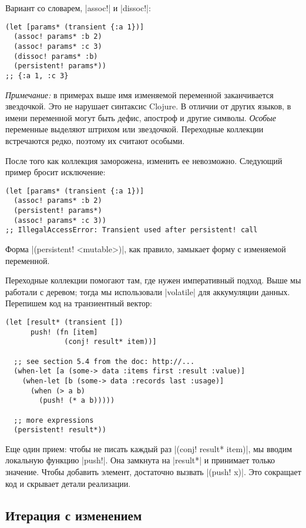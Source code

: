 \noindent
Вариант со словарем, \spverb|assoc!| и \spverb|dissoc!|:

\begin{verbatim}
(let [params* (transient {:a 1})]
  (assoc! params* :b 2)
  (assoc! params* :c 3)
  (dissoc! params* :b)
  (persistent! params*))
;; {:a 1, :c 3}
\end{verbatim}

\emph{Примечание:} в примерах выше имя изменяемой переменной заканчивается
звездочкой. Это не нарушает синтаксис Clojure. В отличии от других языков, в
имени переменной могут быть дефис, апостроф и другие символы. \emph{Особые}
переменные выделяют штрихом или звездочкой. Переходные коллекции встречаются
редко, поэтому их считают особыми.

После того как коллекция заморожена, изменить ее невозможно. Следующий пример
бросит исключение:

\begin{verbatim}
(let [params* (transient {:a 1})]
  (assoc! params* :b 2)
  (persistent! params*)
  (assoc! params* :c 3))
;; IllegalAccessError: Transient used after persistent! call
\end{verbatim}

Форма \spverb|(persistent! <mutable>)|, как правило, замыкает форму с изменяемой
переменной.

Переходные коллекции помогают там, где нужен императивный подход. Выше мы
работали с деревом; тогда мы использовали \spverb|volatile| для аккумуляции
данных. Перепишем код на транзиентный вектор:

\begin{verbatim}
(let [result* (transient [])
      push! (fn [item]
              (conj! result* item))]

  ;; see section 5.4 from the doc: http://...
  (when-let [a (some-> data :items first :result :value)]
    (when-let [b (some-> data :records last :usage)]
      (when (> a b)
        (push! (* a b)))))

  ;; more expressions
  (persistent! result*))
\end{verbatim}

Еще один прием: чтобы не писать каждый раз \spverb|(conj! result* item)|, мы
вводим локальную функцию \spverb|push!|. Она замкнута на \spverb|result*| и
принимает только значение. Чтобы добавить элемент, достаточно вызвать
\spverb|(push! x)|.  Это сокращает код и скрывает детали реализации.

\subsection{Итерация с изменением}

